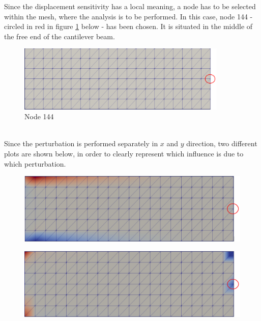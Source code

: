 Since the displacement sensitivity has a local meaning, a node has to be selected within the mesh, where the analysis is to be performed. In this case, node 144 - circled in red in figure \ref{cantileverBeam:nodeOfInterest} below - has been chosen. It is situated in the middle of the free end of the cantilever beam. \\
\begin{figure}[ht]
\centering
  \includegraphics[width=100mm]{images/meshNodeOfInterest.png}
  \caption{Node 144}
  \label{cantileverBeam:nodeOfInterest}
\end{figure}\\
Since the perturbation is performed separately in $x$ and $y$ direction, two different plots are shown below, in order to clearly represent which influence is due to which perturbation. \\
\begin{figure}[ht]
\centering
\begin{minipage}{.5\textwidth}
  \centering
  \includegraphics[width=1.0\linewidth]{images/sensitivityanalysisY.png}
  \label{fig:yDispSens}
\end{minipage}%
\begin{minipage}{.5\textwidth}
  \centering
  \includegraphics[width=1.0\linewidth]{images/sensitivityanalysisX.png}
  \label{fig:xDispSens}
\end{minipage}
\end{figure}\\
